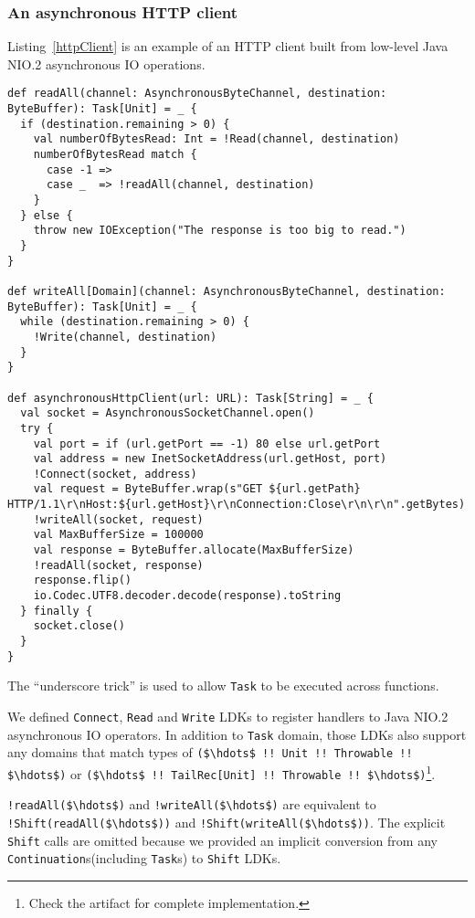 \subsubsection{An asynchronous HTTP client}\label{An asynchronous HTTP client}

Listing~\ref{httpClient} is an example of an HTTP client built from low-level Java NIO.2 asynchronous IO operations.

\begin{lstlisting}[caption={An asynchronous HTTP client},label={httpClient}]
def readAll(channel: AsynchronousByteChannel, destination: ByteBuffer): Task[Unit] = _ {
  if (destination.remaining > 0) {
    val numberOfBytesRead: Int = !Read(channel, destination)
    numberOfBytesRead match {
      case -1 =>
      case _  => !readAll(channel, destination)
    }
  } else {
    throw new IOException("The response is too big to read.")
  }
}

def writeAll[Domain](channel: AsynchronousByteChannel, destination: ByteBuffer): Task[Unit] = _ {
  while (destination.remaining > 0) {
    !Write(channel, destination)
  }
}

def asynchronousHttpClient(url: URL): Task[String] = _ {
  val socket = AsynchronousSocketChannel.open()
  try {
    val port = if (url.getPort == -1) 80 else url.getPort
    val address = new InetSocketAddress(url.getHost, port)
    !Connect(socket, address)
    val request = ByteBuffer.wrap(s"GET ${url.getPath} HTTP/1.1\r\nHost:${url.getHost}\r\nConnection:Close\r\n\r\n".getBytes)
    !writeAll(socket, request)
    val MaxBufferSize = 100000
    val response = ByteBuffer.allocate(MaxBufferSize)
    !readAll(socket, response)
    response.flip()
    io.Codec.UTF8.decoder.decode(response).toString
  } finally {
    socket.close()
  }
}
\end{lstlisting}

The ``underscore trick'' is used to allow \lstinline{Task} to be executed across functions.

We defined \lstinline{Connect}, \lstinline{Read} and \lstinline{Write} LDKs to register handlers to Java NIO.2 asynchronous IO operators. In addition to \lstinline{Task} domain, those LDKs also support any domains that match types of \lstinline[mathescape=true]{($\hdots$ !! Unit !! Throwable !! $\hdots$)} or \lstinline[mathescape=true]{($\hdots$ !! TailRec[Unit] !! Throwable !! $\hdots$)}\footnote{Check the artifact for complete implementation.}.

\lstinline[mathescape=true]{!readAll($\hdots$)} and \lstinline[mathescape=true]{!writeAll($\hdots$)} are equivalent to \lstinline[mathescape=true]{!Shift(readAll($\hdots$))} and \lstinline[mathescape=true]{!Shift(writeAll($\hdots$))}. The explicit \lstinline{Shift} calls are omitted because we provided an implicit conversion from any \lstinline{Continuation}s(including \lstinline{Task}s) to \lstinline{Shift} LDKs.


